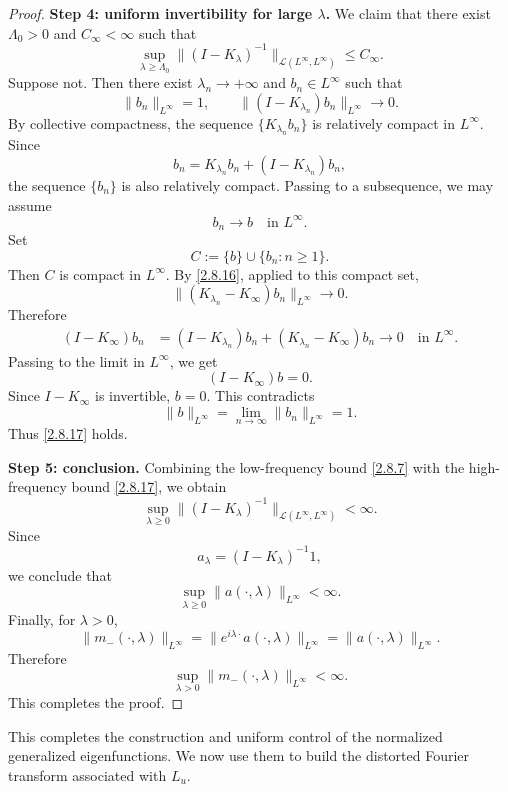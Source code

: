 \documentclass[10pt]{article}
\numberwithin{equation}{section}
\numberwithin{theorem}{section}
\begin{document}
\begin{proof}
\medskip
\noindent\textbf{Step 4: uniform invertibility for large \(\lambda\).}
We claim that there exist \(\Lambda_0>0\) and \(C_\infty<\infty\) such that
\begin{equation}
\label{2.8.17}
\sup_{\lambda\ge\Lambda_0}
\|(I-K_\lambda)^{-1}\|_{\mathcal L(L^\infty,L^\infty)}
\le C_\infty .
\end{equation}
Suppose not. Then there exist \(\lambda_n\to+\infty\) and \(b_n\in L^\infty\) such that
\begin{equation}
\label{2.8.18}
\|b_n\|_{L^\infty}=1,
\qquad
\|(I-K_{\lambda_n})b_n\|_{L^\infty}\to0.
\end{equation}
By collective compactness, the sequence \(\{K_{\lambda_n}b_n\}\) is relatively compact in
\(L^\infty\). Since
\[
b_n=K_{\lambda_n}b_n+(I-K_{\lambda_n})b_n,
\]
the sequence \(\{b_n\}\) is also relatively compact. Passing to a subsequence, we may
assume
\begin{equation}
\label{2.8.19}
b_n\to b
\quad\text{in }L^\infty.
\end{equation}
Set
\[
C:=\{b\}\cup\{b_n:n\ge1\}.
\]
Then \(C\) is compact in \(L^\infty\). By \eqref{2.8.16}, applied to this compact set,
\begin{equation}
\label{2.8.20}
\|(K_{\lambda_n}-K_\infty)b_n\|_{L^\infty}\to0.
\end{equation}
Therefore
\[
\begin{aligned}
(I-K_\infty)b_n
&=
(I-K_{\lambda_n})b_n
+
(K_{\lambda_n}-K_\infty)b_n
\longrightarrow0
\quad\text{in }L^\infty.
\end{aligned}
\]
Passing to the limit in \(L^\infty\), we get
\[
(I-K_\infty)b=0.
\]
Since \(I-K_\infty\) is invertible, \(b=0\). This contradicts
\[
\|b\|_{L^\infty}
=
\lim_{n\to\infty}\|b_n\|_{L^\infty}
=1.
\]
Thus \eqref{2.8.17} holds.

\medskip
\noindent\textbf{Step 5: conclusion.}
Combining the low-frequency bound \eqref{2.8.7} with the high-frequency bound
\eqref{2.8.17}, we obtain
\[
\sup_{\lambda\ge0}
\|(I-K_\lambda)^{-1}\|_{\mathcal L(L^\infty,L^\infty)}
<\infty.
\]
Since
\[
a_\lambda=(I-K_\lambda)^{-1}1,
\]
we conclude that
\[
\sup_{\lambda\ge0}
\|a(\cdot,\lambda)\|_{L^\infty}
<\infty.
\]
Finally, for \(\lambda>0\),
\[
\|m_-(\cdot,\lambda)\|_{L^\infty}
=
\|e^{i\lambda\cdot}a(\cdot,\lambda)\|_{L^\infty}
=
\|a(\cdot,\lambda)\|_{L^\infty}.
\]
Therefore
\[
\sup_{\lambda>0}
\|m_-(\cdot,\lambda)\|_{L^\infty}
<\infty.
\]
This completes the proof.
\end{proof}
This completes the construction and uniform control of the normalized generalized
eigenfunctions. We now use them to build the distorted Fourier transform associated with
\(L_u\).
\end{document}
